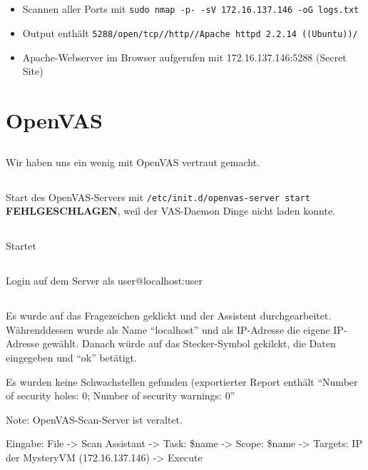 \documentclass[twoside]{article}
\newcommand{\say}[1]{%
	``#1''%
}
\newcommand{\ttt}[1]{%
	\texttt{#1}%
}
\begin{document}
\subsection{}
\begin{itemize}
	\item Scannen aller Ports mit \ttt{sudo nmap -p- -sV 172.16.137.146 -oG logs.txt}
	\item Output enthält \ttt{5288/open/tcp//http//Apache httpd 2.2.14 ((Ubuntu))/}
	\item Apache-Webserver im Browser aufgerufen mit 172.16.137.146:5288 (Secret Site)
\end{itemize}


\section{OpenVAS}
\subsection{}
Wir haben uns ein wenig mit OpenVAS vertraut gemacht.
\subsection{}
Start des OpenVAS-Servers mit \ttt{/etc/init.d/openvas-server start}\\
\textbf{FEHLGESCHLAGEN}, weil der VAS-Daemon Dinge nicht laden konnte.
\subsection{}
Startet
\subsection{}
Login auf dem Server als user@localhost:user
\subsection{}
Es wurde auf das Fragezeichen geklickt und der Assistent durchgearbeitet.
Währenddessen wurde als Name \say{localhost} und als IP-Adresse die eigene IP-Adresse gewählt.
Danach würde auf das Stecker-Symbol gekilckt, die Daten eingegeben und \say{ok} betätigt.

Es wurden keine Schwachstellen gefunden (exportierter Report enthält \say{Number of security holes: 0; Number of security warnings: 0}

Note: OpenVAS-Scan-Server ist veraltet.

Eingabe: File -> Scan Assistant -> Task: \$name -> Scope: \$name -> Targets: IP der MysteryVM (172.16.137.146) -> Execute
\end{document}
